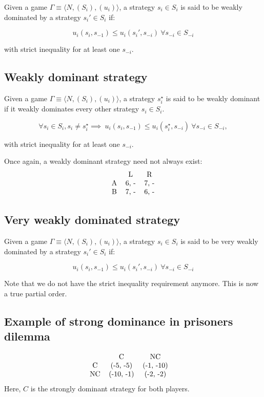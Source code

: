 \documentclass[11pt]{book}
\begin{document}
Given a game $\Gamma \equiv \langle N, (S_i), (u_i) \rangle$, a strategy
$s_i \in S_i$ is said to be weakly dominated by a strategy $s_i' \in S_i$
if:

$$
u_i(s_i, s_{-1}) \leq u_i(s_i', s_{-i})~ \forall s_{-i} \in S_{-i}
$$

with strict inequality for at least one $s_{-i}$. 


\subsection{Weakly dominant strategy}

Given a game $\Gamma \equiv \langle N, (S_i), (u_i) \rangle$, a strategy
$s_i^\star$ is said to be weakly dominant if it weakly dominates every
other strategy $s_i \in S_i$.

$$
\forall s_i \in S_i, s_i \neq s_i^\star \implies ~ u_i(s_i, s_{-1}) \leq u_i(s_i^\star, s_{-i})~ \forall s_{-i} \in S_{-i}, 
$$

with strict inequality for at least one $s_{-i}$. 

Once again, a weakly dominant strategy need not always exist:
$$
\begin{tabular}{ccc}
    & L & R \\
  A & 6, - & 7, - \\
  B & 7, - & 6, - \\
\end{tabular}
$$

\subsection{Very weakly dominated strategy}

Given a game $\Gamma \equiv \langle N, (S_i), (u_i) \rangle$, a strategy
$s_i \in S_i$ is said to be very weakly dominated by a strategy $s_i' \in S_i$
if:

$$
u_i(s_i, s_{-1}) \leq u_i(s_i', s_{-i})~ \forall s_{-i} \in S_{-i}
$$

Note that we do not have the strict inequality requirement anymore. This
is now a true partial order.

\subsection{Example of strong dominance in prisoners dilemma}
$$
\begin{tabular}{ccccc}
     & C & NC & \\
    C & (-5, -5) & (-1, -10) \\ 
    NC &  (-10, -1) & (-2, -2)
\end{tabular}
$$
Here, $C$ is the strongly dominant strategy for both players.
\end{document}
